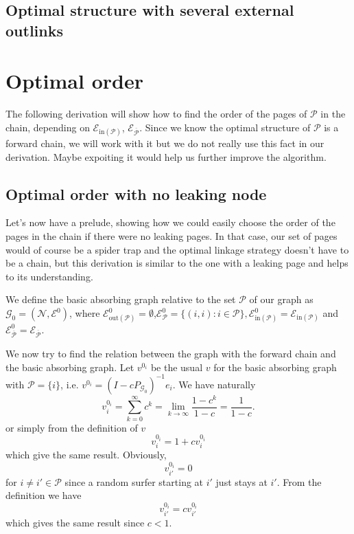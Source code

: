 \documentclass{article}
\newcommand{\1}{\mathbf{1}}
\theoremstyle{definition}
\begin{document}
\subsection{Optimal structure with several external outlinks}


\section{Optimal order}
The following derivation will show how to find the order of the pages of $\mathcal{P}$ in the chain, depending
on $\mathcal{E}_{\text{in}(\mathcal{P})}$, $\mathcal{E}_{\overline{\mathcal{P}}}$.
Since we know the optimal structure of $\mathcal{P}$ is a forward chain, we will work with it but
we do not really use this fact in our derivation.
Maybe expoiting it would help us further improve the algorithm.

\subsection{Optimal order with no leaking node}
\label{sec:no_leak}
Let's now have a prelude, showing how we could easily choose the order of the pages in the chain if there were
no leaking pages.
In that case, our set of pages would of course be a spider trap and the optimal linkage strategy doesn't have to be a chain, but this derivation is similar
to the one with a leaking page and helps to its understanding.

We define the basic absorbing graph relative to the set \(\mathcal{P}\) of our graph as \(\mathcal{G}_0=(\mathcal{N},\mathcal{E}^0)\), where \(\mathcal{E}_{\text{out}(\mathcal{P})}^0 = \emptyset\),\(\mathcal{E}^0_{\mathcal{P}}=\{(i,i):i\in \mathcal{P}\},\mathcal{E}_{\text{in}(\mathcal{P})}^0 = \mathcal{E}_{\text{in}(\mathcal{P})}\) and \( \mathcal{E}^0_{\overline{\mathcal{P}}}=\mathcal{E}_{\overline{\mathcal{P}}}\).

We now try to find the relation between the graph with the forward chain and the basic absorbing graph.
Let \(v^{0_i}\) be the usual \(v\) for the basic absorbing graph with $\mathcal{P} = \{i\}$,
i.e. \(v^{0_i} = (I - cP_{\mathcal{G}_0})^{-1}e_i\).
We have naturally
\[ v_i^{0_i} = \sum_{k=0}^\infty c^k = \lim_{k \to \infty} \frac{1-c^k}{1-c} = \frac{1}{1-c}. \]
or simply from the definition of $v$
\[ v_i^{0_i} = 1 + c v_i^{0_i} \]
which give the same result.
Obviously,
\[ v_{i'}^{0_i} = 0 \]
for $i \neq i' \in \mathcal{P}$ since a random surfer starting at $i'$ just stays at $i'$.
From the definition we have
\[ v_{i'}^{0_i} = c v_{i'}^{0_i} \]
which gives the same result since \(c < 1\).
\end{document}
